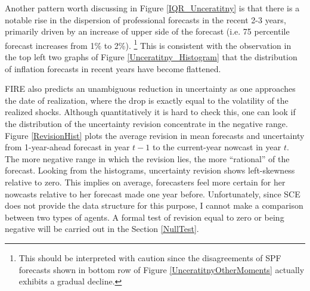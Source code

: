 \documentclass[12pt]{article}
\begin{document}
	Another pattern worth discussing in Figure \ref{IQR_Unceratitny} is that there is a notable rise in the dispersion of professional forecasts in the recent 2-3 years, primarily driven by an increase of upper side of the forecast (i.e. 75 percentile forecast increases from 1\% to 2\%). \footnote{This should be interpreted with caution since the disagreements of SPF forecasts shown in bottom row of Figure \ref{UnceratitnyOtherMoments} actually exhibits a gradual decline. } This is consistent with the observation in the top left two graphs of Figure \ref{Unceratitny_Histogram} that the distribution of inflation forecasts in recent years have become flattened.
	
	FIRE also predicts an unambiguous reduction in uncertainty as one approaches the date of realization, where the drop is exactly equal to the volatility of the realized shocks. Although quantitatively it is hard to check this, one can look if the distribution of the uncertainty revision concentrate in the negative range. Figure \ref{RevisionHist} plots the average revision in mean forecasts and uncertainty from 1-year-ahead forecast in year $t-1$ to the current-year nowcast in year $t$. The more negative range in which the revision lies, the more ``rational'' of the forecast. Looking from the histograms, uncertainty revision shows left-skewness relative to zero. This implies on average,  forecasters feel more certain for her nowcasts relative to her forecast made one year before.  Unfortunately, since SCE does not provide the data structure for this purpose, I cannot make a comparison between two types of agents. A formal test of revision equal to zero or being negative will be carried out in the Section \ref{NullTest}. 
	
\end{document}
